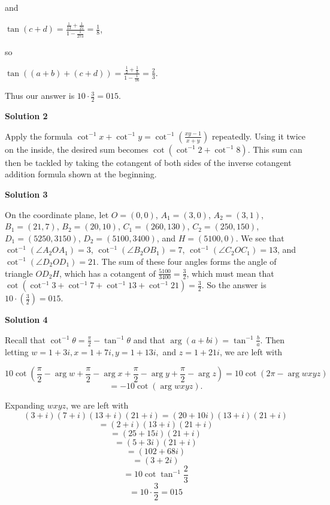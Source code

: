 \begin{enumerate}
 and

 $\tan(c+d) = \frac{\frac{1}{13}+\frac{1}{21}}{1-\frac{1}{273}} = \frac{1}{8}$,

 

 so

 $\tan((a+b)+(c+d)) = \frac{\frac{1}{2}+\frac{1}{8}}{1-\frac{1}{16}} = \frac{2}{3}$.

 

 Thus our answer is $10\cdot\frac{3}{2}=\boxed{015}$.

 



\textbf{Solution 2}

Apply the formula $\cot^{-1}x + \cot^{-1} y = \cot^{-1}\left(\frac {xy-1}{x+y}\right)$ repeatedly. Using it twice on the inside, the desired sum becomes $\cot (\cot^{-1}2+\cot^{-1}8)$. This sum can then be tackled by taking the cotangent of both sides of the inverse cotangent addition formula shown at the beginning.

 



\textbf{Solution 3}

On the coordinate plane, let $O=(0,0)$, $A_1=(3,0)$, $A_2=(3,1)$, $B_1=(21,7)$, $B_2=(20,10)$, $C_1=(260,130)$, $C_2=(250,150)$, $D_1=(5250,3150)$, $D_2=(5100,3400)$, and $H=(5100,0)$. We see that $\cot^{-1}(\angle A_2OA_1)=3$, $\cot^{-1}(\angle B_2OB_1)=7$, $\cot^{-1}(\angle C_2OC_1)=13$, and $\cot^{-1}(\angle D_2OD_1)=21$. The sum of these four angles forms the angle of triangle $OD_2H$, which has a cotangent of $\frac{5100}{3400}=\frac{3}{2}$, which must mean that $\cot( \cot^{-1}3+\cot^{-1}7+\cot^{-1}13+\cot^{-1}21)=\frac{3}{2}$. So the answer is $10\cdot\left(\frac{3}{2}\right)=\boxed{015}.$




\textbf{Solution 4}

Recall that $\cot^{-1}\theta = \frac{\pi}{2} - \tan^{-1}\theta$ and that $\arg(a + bi) = \tan^{-1}\frac{b}{a}$. Then letting $w = 1 + 3i, x = 1 + 7i, y = 1 + 13i,$ and $z = 1 + 21i$, we are left with

 
 \[10\cot(\frac{\pi}{2} - \arg w + \frac{\pi}{2} - \arg x + \frac{\pi}{2} - \arg y + \frac{\pi}{2} - \arg z) = 10\cot(2\pi - \arg wxyz)\]
 \[= -10\cot(\arg wxyz).\]

 Expanding $wxyz$, we are left with
 \[(3+i)(7+i)(13+i)(21+i) = (20+10i)(13+i)(21+i)\]
 \[= (2+i)(13+i)(21+i)\]
 \[= (25+15i)(21+i)\]
 \[= (5+3i)(21+i)\]
 \[= (102+68i)\]
 \[= (3+2i)\]
 \[= 10\cot \tan^{-1}\frac{2}{3}\]
 \[= 10 \cdot \frac{3}{2} = \boxed{015}\]




\end{enumerate}
